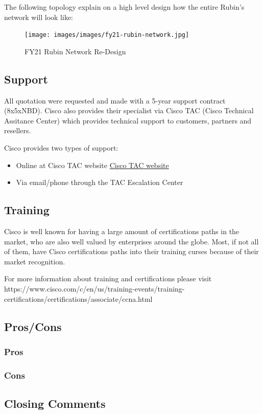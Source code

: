 The following topology explain on a high level design how the entire Rubin's network will look like:

\begin{figure}
    \texttt{[image: images/images/fy21-rubin-network.jpg]}
    \centering
    \caption{FY21 Rubin Network Re-Design}
\end{figure}

\subsection{Support}

All quotation were requested and made with a 5-year support contract (8x5xNBD). Cisco also provides their specialist via Cisco TAC (Cisco Technical Assitance Center) which provides technical support to customers, partners and resellers.

Cisco provides two types of support:

\begin{itemize}
    \item Online at Cisco TAC website \href{http://www.cisco.com/tac}{Cisco TAC website}
    \item Via email/phone through the TAC Escalation Center
\end{itemize}

\subsection{Training}

Cisco is well known for having a large amount of certifications paths in the market, who are also well valued by enterprises around the globe. Most, if not all of them, have Cisco certifications paths into their training curses because of their market recognition. 

For more information about training and certifications please visit https://www.cisco.com/c/en/us/training-events/training-certifications/certifications/associate/ccna.html

\subsection{Pros/Cons}
\subsubsection{Pros}
\subsubsection{Cons}
\subsection{Closing Comments}
